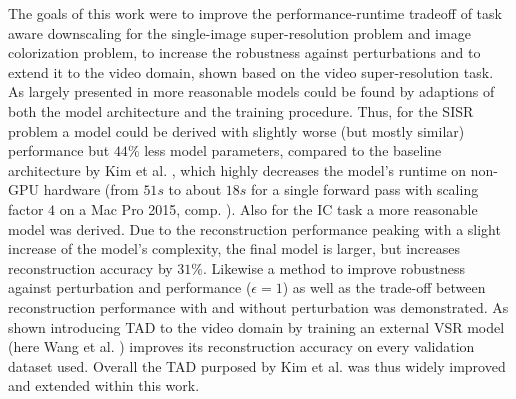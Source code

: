 The goals of this work were to improve the performance-runtime tradeoff of task aware downscaling for the single-image super-resolution problem and image colorization problem, to increase the robustness against perturbations and to extend it to the video domain, shown based on the video super-resolution task.
\newline
As largely presented in  more reasonable models could be found by adaptions of both the model architecture and the training procedure. Thus, for the \ac{SISR} problem a model could be derived with slightly worse (but mostly similar) performance but
$44 \%$ less model parameters, compared to the baseline architecture by Kim et al. \cite{TAID}, which highly decreases the model's runtime on non-GPU hardware (from $51s$ to about $18s$ for a single forward pass with scaling factor $4$ on a Mac Pro 2015, comp. ). Also for the \ac{IC} task a more reasonable model was derived. Due to the reconstruction performance peaking with a slight increase of the model's complexity, the final model is larger, but increases reconstruction accuracy by $31 \%$. Likewise a method to improve robustness against perturbation and performance ($\epsilon = 1$) as well as the trade-off between reconstruction performance with and without perturbation was demonstrated. As shown introducing \ac{TAD} to the video domain by training an external \ac{VSR} model (here Wang et al. \cite{LFVSRTHROFE}) improves its reconstruction accuracy on every validation dataset used. Overall the \ac{TAD} purposed by Kim et al. was thus widely improved and extended within this work. 
\newline 
